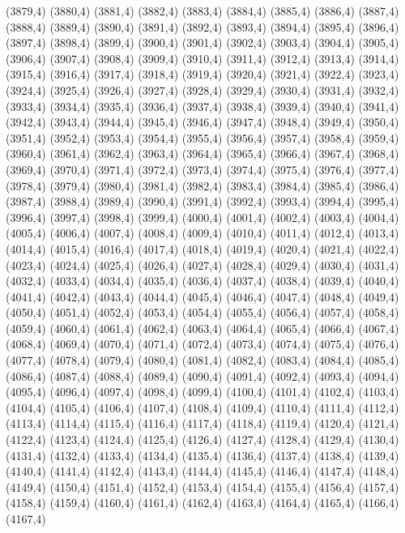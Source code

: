 (3879,4)
(3880,4)
(3881,4)
(3882,4)
(3883,4)
(3884,4)
(3885,4)
(3886,4)
(3887,4)
(3888,4)
(3889,4)
(3890,4)
(3891,4)
(3892,4)
(3893,4)
(3894,4)
(3895,4)
(3896,4)
(3897,4)
(3898,4)
(3899,4)
(3900,4)
(3901,4)
(3902,4)
(3903,4)
(3904,4)
(3905,4)
(3906,4)
(3907,4)
(3908,4)
(3909,4)
(3910,4)
(3911,4)
(3912,4)
(3913,4)
(3914,4)
(3915,4)
(3916,4)
(3917,4)
(3918,4)
(3919,4)
(3920,4)
(3921,4)
(3922,4)
(3923,4)
(3924,4)
(3925,4)
(3926,4)
(3927,4)
(3928,4)
(3929,4)
(3930,4)
(3931,4)
(3932,4)
(3933,4)
(3934,4)
(3935,4)
(3936,4)
(3937,4)
(3938,4)
(3939,4)
(3940,4)
(3941,4)
(3942,4)
(3943,4)
(3944,4)
(3945,4)
(3946,4)
(3947,4)
(3948,4)
(3949,4)
(3950,4)
(3951,4)
(3952,4)
(3953,4)
(3954,4)
(3955,4)
(3956,4)
(3957,4)
(3958,4)
(3959,4)
(3960,4)
(3961,4)
(3962,4)
(3963,4)
(3964,4)
(3965,4)
(3966,4)
(3967,4)
(3968,4)
(3969,4)
(3970,4)
(3971,4)
(3972,4)
(3973,4)
(3974,4)
(3975,4)
(3976,4)
(3977,4)
(3978,4)
(3979,4)
(3980,4)
(3981,4)
(3982,4)
(3983,4)
(3984,4)
(3985,4)
(3986,4)
(3987,4)
(3988,4)
(3989,4)
(3990,4)
(3991,4)
(3992,4)
(3993,4)
(3994,4)
(3995,4)
(3996,4)
(3997,4)
(3998,4)
(3999,4)
(4000,4)
(4001,4)
(4002,4)
(4003,4)
(4004,4)
(4005,4)
(4006,4)
(4007,4)
(4008,4)
(4009,4)
(4010,4)
(4011,4)
(4012,4)
(4013,4)
(4014,4)
(4015,4)
(4016,4)
(4017,4)
(4018,4)
(4019,4)
(4020,4)
(4021,4)
(4022,4)
(4023,4)
(4024,4)
(4025,4)
(4026,4)
(4027,4)
(4028,4)
(4029,4)
(4030,4)
(4031,4)
(4032,4)
(4033,4)
(4034,4)
(4035,4)
(4036,4)
(4037,4)
(4038,4)
(4039,4)
(4040,4)
(4041,4)
(4042,4)
(4043,4)
(4044,4)
(4045,4)
(4046,4)
(4047,4)
(4048,4)
(4049,4)
(4050,4)
(4051,4)
(4052,4)
(4053,4)
(4054,4)
(4055,4)
(4056,4)
(4057,4)
(4058,4)
(4059,4)
(4060,4)
(4061,4)
(4062,4)
(4063,4)
(4064,4)
(4065,4)
(4066,4)
(4067,4)
(4068,4)
(4069,4)
(4070,4)
(4071,4)
(4072,4)
(4073,4)
(4074,4)
(4075,4)
(4076,4)
(4077,4)
(4078,4)
(4079,4)
(4080,4)
(4081,4)
(4082,4)
(4083,4)
(4084,4)
(4085,4)
(4086,4)
(4087,4)
(4088,4)
(4089,4)
(4090,4)
(4091,4)
(4092,4)
(4093,4)
(4094,4)
(4095,4)
(4096,4)
(4097,4)
(4098,4)
(4099,4)
(4100,4)
(4101,4)
(4102,4)
(4103,4)
(4104,4)
(4105,4)
(4106,4)
(4107,4)
(4108,4)
(4109,4)
(4110,4)
(4111,4)
(4112,4)
(4113,4)
(4114,4)
(4115,4)
(4116,4)
(4117,4)
(4118,4)
(4119,4)
(4120,4)
(4121,4)
(4122,4)
(4123,4)
(4124,4)
(4125,4)
(4126,4)
(4127,4)
(4128,4)
(4129,4)
(4130,4)
(4131,4)
(4132,4)
(4133,4)
(4134,4)
(4135,4)
(4136,4)
(4137,4)
(4138,4)
(4139,4)
(4140,4)
(4141,4)
(4142,4)
(4143,4)
(4144,4)
(4145,4)
(4146,4)
(4147,4)
(4148,4)
(4149,4)
(4150,4)
(4151,4)
(4152,4)
(4153,4)
(4154,4)
(4155,4)
(4156,4)
(4157,4)
(4158,4)
(4159,4)
(4160,4)
(4161,4)
(4162,4)
(4163,4)
(4164,4)
(4165,4)
(4166,4)
(4167,4)
